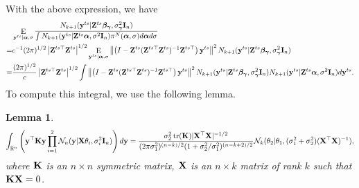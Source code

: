 \documentclass[11pt]{article}
\DeclareMathOperator{\mytr}{tr}
\DeclareMathOperator{\myE}{E}
\newcommand{\By}{\mathbf{y}}    \newcommand{\Bz}{\mathbf{z}}
\newcommand{\bfsym}[1]{\ensuremath{\boldsymbol{#1}}}
\def\balpha{\bfsym \alpha}
\def\bbeta{\bfsym \beta}
\def\bgamma{\bfsym \gamma}             \def\bGamma{\bfsym \Gamma}
\theoremstyle{plain}
\newtheorem{lemma}{\quad\quad Lemma}
\theoremstyle{definition}
\theoremstyle{remark}
\begin{document}
With the above expression, we have
\begin{equation*}
    \begin{split}
    &\myE_{\By^{ts}|\balpha, \sigma}
    \frac{N_{k+1} (\By^{ts} | \BZ^{ts} \bbeta_{\bgamma}, \sigma^2_{\bgamma} \BI_n)}{\int N_{k+1} (\By^{ts} | \BZ^{ts} \balpha, \sigma^2 \BI_n) \pi^N (\balpha, \sigma) d\balpha d \sigma}
    \\
    =
    &
    c^{-1}
    (2\pi)^{1/2} \left| \BZ^{ts\top} \BZ^{ts} \right|^{1/2} 
    \myE_{\By^{ts}|\balpha, \sigma}
     \left\|\left(I-\BZ^{ts} (\BZ^{ts\top} \BZ^{ts})^{-1}\BZ^{ts\top}\right)\By^{ts}\right\|^2
    N_{k+1} (\By^{ts} | \BZ^{ts} \bbeta_{\bgamma}, \sigma^2_{\bgamma} \BI_n)
    \\
    =
    &
    \frac{(2\pi)^{1/2}}{c} \left| \BZ^{ts\top} \BZ^{ts} \right|^{1/2} 
    \int
     \left\|\left(I-\BZ^{ts} (\BZ^{ts\top} \BZ^{ts})^{-1}\BZ^{ts\top}\right)\By^{ts}\right\|^2
    N_{k+1} (\By^{ts} | \BZ^{ts} \bbeta_{\bgamma}, \sigma^2_{\bgamma} \BI_n)
    N_{k+1} (\By^{ts} | \BZ^{ts} \balpha, \sigma^2 \BI_n)
    d\By^{ts}.
    \end{split}
\end{equation*}
To compute this integral, we use the following lemma.
\begin{lemma}
    \begin{equation*}
    \int_{\mathbb R^n} \left(\By^\top \BK \By \prod_{i=1}^2 \mathcal N_n (\By| \BX \theta_i ,\sigma^2_i \BI_n)\right) d\By
    =
    \frac{\sigma_2^2 \mytr(\BK) |\BX^\top \BX|^{-1/2}}{
        (2\pi\sigma_1^2)^{(n-k)/2} (1+\sigma_2^2/\sigma_1^2)^{(n-k+2)/2}
    }
    \mathcal{N}_k (\theta_2 | \theta_1,(\sigma_1^2 +\sigma_2^2) (\BX^\top \BX)^{-1}),
\end{equation*}
where $\mathbf{K}$ is an $n\times n$ symmetric matrix, $\mathbf{X}$ is an $n\times k $ matrix of rank $k$ such that $\mathbf{K} \mathbf{X}=0$.
\end{lemma}
\end{document}
